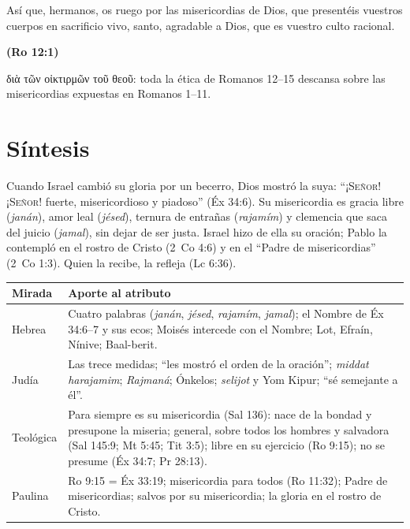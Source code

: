 \documentclass[11pt,letterpaper]{article}
\newcommand{\grc}[1]{\foreignlanguage{ancientgreek}{#1}}
\newcommand{\SENOR}{\textsc{Señor}}
\newcommand{\fuente}[1]{\par\hfill{\upshape\bfseries\small\textcolor{azul}{#1}}}
\begin{document}
\begin{cita}Así que, hermanos, os ruego por las misericordias de Dios, que presentéis vuestros cuerpos en sacrificio vivo, santo, agradable a Dios, que es vuestro culto racional.\fuente{(Ro 12:1)}\end{cita}

\grc{διὰ τῶν οἰκτιρμῶν τοῦ θεοῦ}: toda la ética de Romanos 12--15 descansa sobre las misericordias expuestas en Romanos 1--11.

\section{Síntesis}

\begin{tcolorbox}[colback=papiro,colframe=azul,boxrule=1pt,arc=3pt]
Cuando Israel cambió su gloria por un becerro, Dios mostró la suya: ``¡\SENOR! ¡\SENOR! fuerte, misericordioso y piadoso'' (Éx 34:6). Su misericordia es gracia libre (\emph{janán}), amor leal (\emph{jésed}), ternura de entrañas (\emph{rajamím}) y clemencia que saca del juicio (\emph{jamal}), sin dejar de ser justa. Israel hizo de ella su oración; Pablo la contempló en el rostro de Cristo (2~Co 4:6) y en el ``Padre de misericordias'' (2~Co 1:3). Quien la recibe, la refleja (Lc 6:36).
\end{tcolorbox}

\begin{center}\small\renewcommand{\arraystretch}{1.3}
\begin{tabular}{@{}L{3.0cm}L{11.4cm}@{}}
\toprule
\textbf{Mirada} & \textbf{Aporte al atributo} \\ \midrule
Hebrea & Cuatro palabras (\emph{janán}, \emph{jésed}, \emph{rajamím}, \emph{jamal}); el Nombre de Éx 34:6--7 y sus ecos; Moisés intercede con el Nombre; Lot, Efraín, Nínive; Baal-berit. \\
Judía & Las trece medidas; ``les mostró el orden de la oración''; \emph{middat harajamim}; \emph{Rajmaná}; Ónkelos; \emph{selijot} y Yom Kipur; ``sé semejante a él''. \\
Teológica & Para siempre es su misericordia (Sal 136): nace de la bondad y presupone la miseria; general, sobre todos los hombres y salvadora (Sal 145:9; Mt 5:45; Tit 3:5); libre en su ejercicio (Ro 9:15); no se presume (Éx 34:7; Pr 28:13). \\
Paulina & Ro 9:15 = Éx 33:19; misericordia para todos (Ro 11:32); Padre de misericordias; salvos por su misericordia; la gloria en el rostro de Cristo. \\
\bottomrule
\end{tabular}\end{center}
\end{document}
